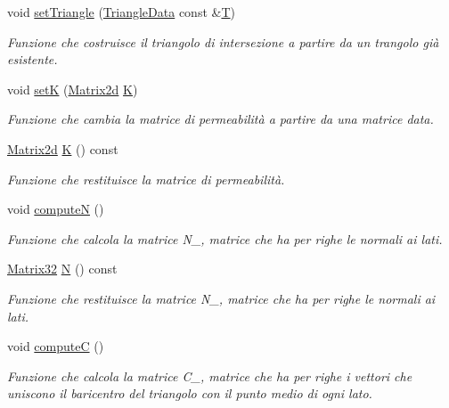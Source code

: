 \begin{DoxyCompactItemize}
void \hyperlink{classMatrixBifurcationHandler_aa7e601bac77856cac8db77c58023c1b4}{set\-Triangle} (\hyperlink{classTriangleData}{Triangle\-Data} const \&\hyperlink{classMatrixBifurcationHandler_a3b7305f6106add811e7b4b69f5642e86}{T})
\begin{DoxyCompactList}\small\item\em Funzione che costruisce il triangolo di intersezione a partire da un trangolo già esistente. \end{DoxyCompactList}\item 
void \hyperlink{classMatrixBifurcationHandler_acbc7b99389ad5eacd86f73b0ed08829b}{set\-K} (\hyperlink{Core_8h_a1694976dd66ed00e5f0618f4f8821163}{Matrix2d} \hyperlink{classMatrixBifurcationHandler_ac7d63c6d730079862dd8238928d94b26}{K})
\begin{DoxyCompactList}\small\item\em Funzione che cambia la matrice di permeabilità a partire da una matrice data. \end{DoxyCompactList}\item 
\hyperlink{Core_8h_a1694976dd66ed00e5f0618f4f8821163}{Matrix2d} \hyperlink{classMatrixBifurcationHandler_ac7d63c6d730079862dd8238928d94b26}{K} () const 
\begin{DoxyCompactList}\small\item\em Funzione che restituisce la matrice di permeabilità. \end{DoxyCompactList}\item 
void \hyperlink{classMatrixBifurcationHandler_ac134a5731e6614e543241a018ccf8c34}{compute\-N} ()
\begin{DoxyCompactList}\small\item\em Funzione che calcola la matrice N\-\_\-, matrice che ha per righe le normali ai lati. \end{DoxyCompactList}\item 
\hyperlink{Core_8h_aee82131e398edee47a44d675ee802368}{Matrix32} \hyperlink{classMatrixBifurcationHandler_a77f006579fad0f0f08c10bf684bbd16a}{N} () const 
\begin{DoxyCompactList}\small\item\em Funzione che restituisce la matrice N\-\_\-, matrice che ha per righe le normali ai lati. \end{DoxyCompactList}\item 
void \hyperlink{classMatrixBifurcationHandler_ac179ca406307a3d2ee5d5b5af94d265e}{compute\-C} ()
\begin{DoxyCompactList}\small\item\em Funzione che calcola la matrice C\-\_\-, matrice che ha per righe i vettori che uniscono il baricentro del triangolo con il punto medio di ogni lato. \end{DoxyCompactList}\item 

\end{DoxyCompactItemize}
